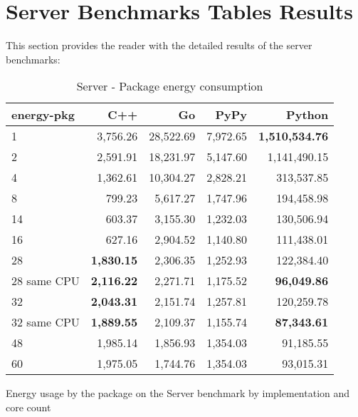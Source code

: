 \chapter{Server Benchmarks Tables Results}
\label{chap:appendix-server-benchmarks}
This section provides the reader with the detailed results of the server benchmarks:

\begin{table}[H]
    \centering
    \begin{tabular}{lrrrr}
        \hline
        energy-pkg     & C++                & Go         & PyPy       & Python        \\
        \hline
        1              & 3,756.26            & 28,522.69   & 7,972.65   & \textbf{1,510,534.76}  \\
        2              & 2,591.91            & 18,231.97   & 5,147.60   & 1,141,490.15           \\
        4              & 1,362.61            & 10,304.27   & 2,828.21   &   313,537.85           \\
        8	           &   799.23 	         & 5,617.27    & 1,747.96   &	194,458.98           \\ 
        14             &   603.37            & 3,155.30    & 1,232.03   &   130,506.94           \\
        16             &   627.16            & 2,904.52    & 1,140.80   &   111,438.01           \\
        28             & \textbf{1,830.15}   & 2,306.35    & 1,252.93   &   122,384.40           \\
        28 same CPU    & \textbf{2,116.22}   & 2,271.71    & 1,175.52   &   \textbf{96,049.86}   \\
        32             & \textbf{2,043.31}   & 2,151.74    & 1,257.81   &   120,259.78           \\
        32 same CPU    & \textbf{1,889.55}   & 2,109.37    & 1,155.74   &   \textbf{87,343.61}   \\
        48             &   1,985.14          & 1,856.93    & 1,354.03   &    91,185.55           \\
        60             &   1,975.05          & 1,744.76    & 1,354.03   &    93,015.31           \\
        \hline
    \end{tabular}
\caption{Server - Package energy consumption}{Energy usage by the package on the Server benchmark by implementation and core count}
\label{tab:server-energy-pkg}
\end{table}

